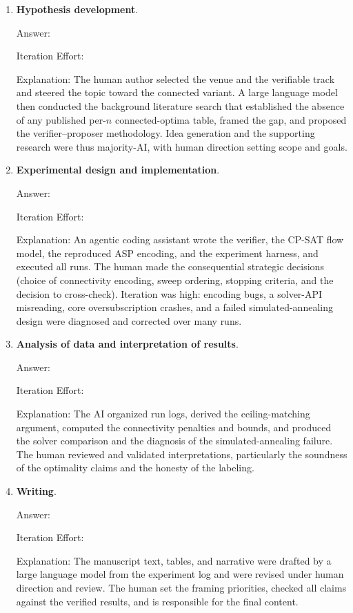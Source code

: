 \documentclass{article}
\begin{document}
\begin{enumerate}

    \item \textbf{Hypothesis development}.

    Answer: \involvementC{}

    Iteration Effort: \iterationMedium{}

    Explanation: The human author selected the venue and the verifiable track and steered the topic toward the connected variant. A large language model then conducted the background literature search that established the absence of any published per-$n$ connected-optima table, framed the gap, and proposed the verifier--proposer methodology. Idea generation and the supporting research were thus majority-AI, with human direction setting scope and goals.

    \item \textbf{Experimental design and implementation}.

    Answer: \involvementC{}

    Iteration Effort: \iterationHigh{}

    Explanation: An agentic coding assistant wrote the verifier, the CP-SAT flow model, the reproduced ASP encoding, and the experiment harness, and executed all runs. The human made the consequential strategic decisions (choice of connectivity encoding, sweep ordering, stopping criteria, and the decision to cross-check). Iteration was high: encoding bugs, a solver-API misreading, core oversubscription crashes, and a failed simulated-annealing design were diagnosed and corrected over many runs.

    \item \textbf{Analysis of data and interpretation of results}.

    Answer: \involvementC{}

    Iteration Effort: \iterationMedium{}

    Explanation: The AI organized run logs, derived the ceiling-matching argument, computed the connectivity penalties and bounds, and produced the solver comparison and the diagnosis of the simulated-annealing failure. The human reviewed and validated interpretations, particularly the soundness of the optimality claims and the honesty of the labeling.

    \item \textbf{Writing}.

    Answer: \involvementC{}

    Iteration Effort: \iterationMedium{}

    Explanation: The manuscript text, tables, and narrative were drafted by a large language model from the experiment log and were revised under human direction and review. The human set the framing priorities, checked all claims against the verified results, and is responsible for the final content.

\end{enumerate}
\end{document}

